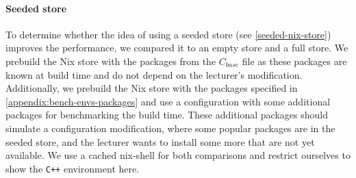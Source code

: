 \paragraph{Seeded store}\label{results-seeded-nix-store}
To determine whether the idea of using a seeded store (see \ref{seeded-nix-store}) improves the performance, we compared it to an empty store and a full store. We prebuild the Nix store with the packages from the $C_{base}$ file as these packages are known at build time and do not depend on the lecturer’s modification. Additionally, we prebuild the Nix store with the packages specified in \ref{appendix:bench-envs-packages} and use a configuration with some additional packages for benchmarking the build time. These additional packages should simulate a configuration modification, where some popular packages are in the seeded store, and the lecturer wants to install some more that are not yet available. We use a cached nix-shell for both comparisons and restrict ourselves to show the \verb|C++| environment here.

